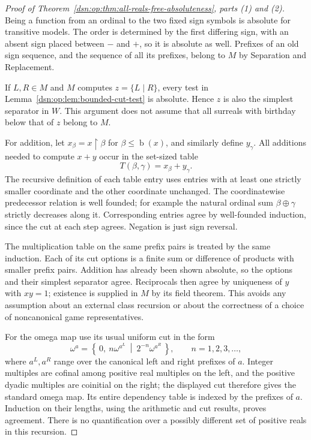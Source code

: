 \documentclass[11pt,a4paper]{article}
\numberwithin{equation}{section}
\theoremstyle{definition}
\theoremstyle{remark}
\newcommand{\bd}{\operatorname{b}}
\begin{document}
\begin{proof}[Proof of Theorem~\ref{dsn:op:thm:all-reals-free-absoluteness},
parts (1) and (2)]
Being a function from an ordinal to the two fixed sign symbols is
absolute for transitive models.  The order is determined by the first
differing sign, with an absent sign placed between $-$ and $+$, so it is
absolute as well.  Prefixes of an old sign sequence, and the sequence of
all its prefixes, belong to $M$ by Separation and Replacement.

If $L,R\in M$ and $M$ computes $z=\{L\mid R\}$, every test in
Lemma~\ref{dsn:op:lem:bounded-cut-test} is absolute.  Hence $z$ is also the
simplest separator in $W$.  This argument does not assume that all
surreals with birthday below that of $z$ belong to $M$.

For addition, let $x_\beta=x\restriction\beta$ for
$\beta\leq\bd(x)$, and similarly define $y_\gamma$.
All additions needed to compute $x+y$ occur in the set-sized table
\[
 T(\beta,\gamma)=x_\beta+y_\gamma.
\]
The recursive definition of each table entry uses entries with at least
one strictly smaller coordinate and the other coordinate unchanged.
The coordinatewise predecessor relation is well founded; for example
the natural ordinal sum $\beta\mathbin{\oplus}\gamma$ strictly decreases
along it.  Corresponding entries agree by well-founded induction, since
the cut at each step agrees.  Negation is just sign reversal.

The multiplication table on the same prefix pairs is treated by the
same induction.  Each of its cut options is a finite sum or difference
of products with smaller prefix pairs.  Addition has already been
shown absolute, so the options and their simplest separator agree.
Reciprocals then agree by uniqueness of $y$ with $xy=1$; existence is
supplied in $M$ by its field theorem.  This avoids any assumption about
an external class recursion or about the correctness of a choice of
noncanonical game representatives.

For the omega map use its usual uniform cut in the form
\[
 \omega^a=
 \left\{\,0,\ n\omega^{a^L}
 \ \middle|\ 2^{-n}\omega^{a^R}\,\right\},
 \qquad n=1,2,3,\ldots,
\]
where $a^L,a^R$ range over the canonical left and right prefixes of
$a$.  Integer multiples are cofinal among positive real multiples on
the left, and the positive dyadic multiples are coinitial on the right;
the displayed cut therefore gives the standard omega map.  Its entire
dependency table is indexed by the prefixes of $a$.  Induction on
their lengths, using the arithmetic and cut results, proves agreement.
There is no quantification over a possibly different set of positive
reals in this recursion.
\end{proof}
\end{document}
